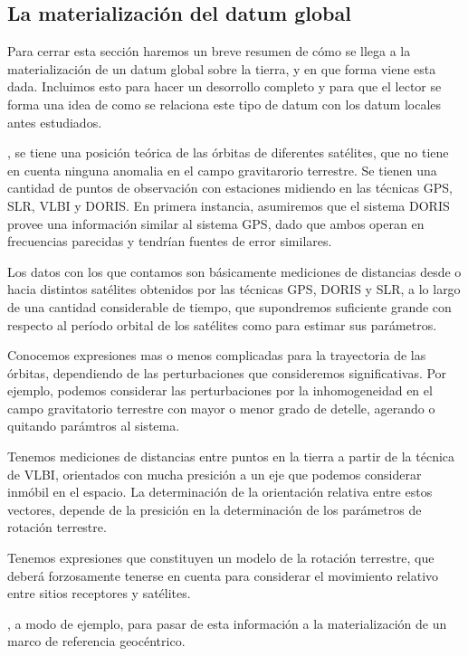 \documentclass{tufte-book}
\begin{document}
\subsection{La materialización del datum global}

Para cerrar esta sección haremos un breve resumen de cómo se llega a la materialización de un datum
global sobre la tierra, y en que forma viene esta dada. Incluimos esto para hacer un desorrollo completo
y para que el lector se forma una idea de como se relaciona este tipo de datum con los datum locales
antes estudiados.

, se tiene una posición teórica de las órbitas de diferentes
satélites, que no tiene en cuenta ninguna anomalia en el campo gravitarorio terrestre. Se tienen una
cantidad de puntos de observación con estaciones midiendo en las técnicas GPS, SLR, VLBI y DORIS.
En primera instancia, asumiremos que el sistema DORIS provee una información similar al sistema GPS,
dado que ambos operan en frecuencias parecidas y tendrían fuentes de error similares.

Los datos con los que contamos son básicamente mediciones de distancias desde o hacia
distintos satélites obtenidos por las técnicas GPS, DORIS y SLR, a lo largo de una cantidad
considerable de tiempo, que supondremos suficiente grande con respecto al período orbital
de los satélites como para estimar sus parámetros.

Conocemos expresiones mas o menos complicadas para la trayectoria de las órbitas,
dependiendo de las perturbaciones que consideremos significativas. Por ejemplo, podemos
considerar las perturbaciones por la inhomogeneidad en el campo gravitatorio terrestre
con mayor o menor grado de detelle, agerando o quitando parámtros al sistema.

Tenemos mediciones de distancias entre puntos en la tierra a partir de la técnica
de VLBI, orientados con mucha presición a un eje que podemos considerar inmóbil
en el espacio. La determinación de la orientación relativa entre estos vectores,
depende de la presición en la determinación de los parámetros de rotación terrestre.

Tenemos expresiones que constituyen un modelo de la rotación terrestre, que
deberá forzosamente tenerse en cuenta para considerar el movimiento relativo
entre sitios receptores y satélites.

, a modo de ejemplo, para pasar
de esta información a la materialización de un marco de referencia geocéntrico.
\end{document}
